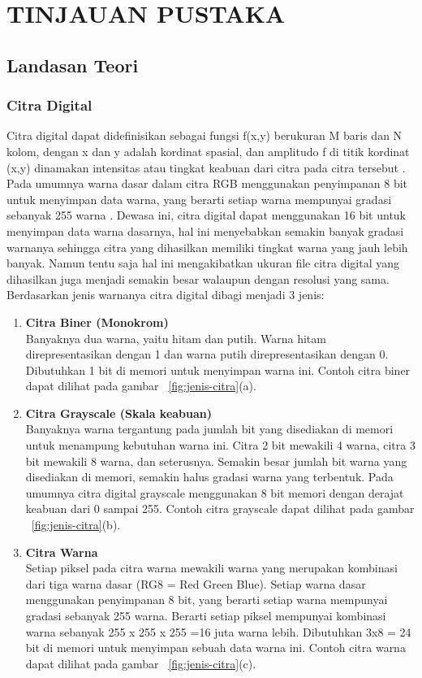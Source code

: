 
\chapter{TINJAUAN PUSTAKA}


\section{Landasan Teori}

\subsection{Citra Digital}
Citra digital dapat didefinisikan sebagai fungsi f(x,y) berukuran M baris dan N kolom, dengan x dan y adalah kordinat spasial, dan amplitudo f di titik kordinat (x,y) dinamakan intensitas atau tingkat keabuan dari citra pada citra tersebut . Pada umumnya warna dasar dalam citra RGB menggunakan penyimpanan 8 bit untuk menyimpan data warna, yang berarti setiap warna mempunyai gradasi sebanyak 255 warna . Dewasa ini, citra digital dapat menggunakan 16 bit untuk menyimpan data warna dasarnya, hal ini menyebabkan semakin banyak gradasi warnanya sehingga citra yang dihasilkan memiliki tingkat warna yang jauh lebih banyak. Namun tentu saja hal ini mengakibatkan ukuran file citra digital yang dihasilkan juga menjadi semakin besar walaupun dengan resolusi yang sama. Berdasarkan jenis warnanya citra digital dibagi menjadi 3 jenis:

\begin{enumerate} [label=\textbf{\alph*.}]
    \item \textbf{Citra Biner (Monokrom)} \\ 
    Banyaknya dua warna, yaitu hitam dan putih. Warna hitam direpresentasikan dengan 1 dan warna putih direpresentasikan dengan 0. Dibutuhkan 1 bit di memori untuk menyimpan warna ini. Contoh citra biner dapat dilihat pada gambar ~\ref{fig:jenis-citra}(a).
    \item \textbf{Citra Grayscale (Skala keabuan)} \\ 
    Banyaknya warna tergantung pada jumlah bit yang disediakan di memori untuk menampung kebutuhan warna ini. Citra 2 bit mewakili 4 warna, citra 3 bit mewakili 8 warna, dan seterusnya. Semakin besar jumlah bit warna yang disediakan di memori, semakin halus gradasi warna yang terbentuk. Pada umumnya citra digital grayscale menggunakan 8 bit memori dengan derajat keabuan dari 0 sampai 255. Contoh citra grayscale dapat dilihat pada gambar ~\ref{fig:jenis-citra}(b).
    \item \textbf{Citra Warna} \\ 
    Setiap piksel pada citra warna mewakili warna yang merupakan kombinasi dari tiga warna dasar (RG8 = Red Green Blue). Setiap warna dasar menggunakan penyimpanan 8 bit, yang berarti setiap warna mempunyai gradasi sebanyak 255 warna. Berarti setiap piksel mempunyai kombinasi warna sebanyak 255 x 255 x 255 =16 juta warna lebih. Dibutuhkan 3x8 = 24 bit di memori untuk menyimpan sebuah data warna ini. Contoh citra warna dapat dilihat pada gambar ~\ref{fig:jenis-citra}(c).
\end{enumerate}

